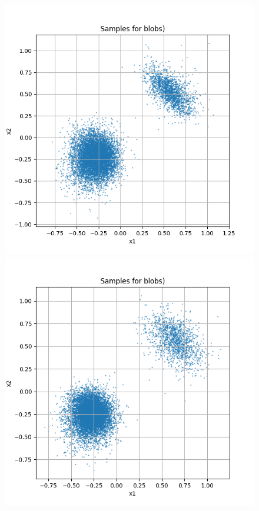 \documentclass[a4paper,12pt]{article}
\begin{document}
\begin{figure}[H]
  \begin{minipage}{0.3\textwidth}
      \centering
      \includegraphics[width=\linewidth]{"images/Samples for ddpm_2_100_0.0001_0.02_blobs.png"}
  \end{minipage}
  \begin{minipage}{0.3\textwidth}
      \centering
      \includegraphics[width=\linewidth]{"images/Samples for ddpm_2_150_0.0001_0.02_blobs.png"}

\end{minipage}
\end{figure}
\end{document}
